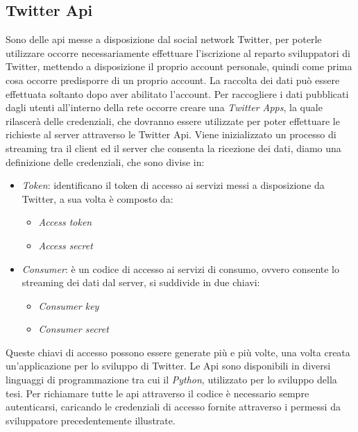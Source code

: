 \subsection{Twitter Api}
Sono delle api messe a disposizione dal social network Twitter, per poterle utilizzare occorre necessariamente effettuare l'iscrizione al reparto sviluppatori di Twitter, mettendo a disposizione il proprio account personale, quindi come prima cosa occorre predisporre di un proprio account. La raccolta dei dati può essere effettuata soltanto dopo aver abilitato l'account. Per raccogliere i dati pubblicati dagli utenti all'interno della rete occorre creare una \textit{Twitter Apps}, la quale rilascerà delle credenziali, che dovranno essere utilizzate per poter effettuare le richieste  al server attraverso le Twitter Api. Viene inizializzato un processo di streaming tra il client ed il server che consenta la ricezione dei dati, diamo una definizione delle credenziali, che sono divise in:
\begin{itemize}
\item \textit{Token}: identificano il token di accesso ai servizi messi a disposizione da Twitter, a sua volta è composto da:
\begin{itemize}
\item \textit{Access token}
\item \textit{Access secret}
\end{itemize}
\item \textit{Consumer}: è un codice di accesso ai servizi di consumo, ovvero consente lo streaming dei dati dal server, si suddivide in due chiavi:
\begin{itemize}
\item \textit{Consumer key}
\item \textit{Consumer secret}
\end{itemize}
\end{itemize}
Queste chiavi di accesso possono essere generate più e più volte, una volta creata un'applicazione per lo sviluppo di Twitter.
Le Api sono disponibili in diversi linguaggi di programmazione tra cui il \textit{Python}, utilizzato per lo sviluppo della tesi.
Per richiamare tutte le api attraverso il codice è necessario sempre autenticarsi, caricando le credenziali di accesso  fornite attraverso i permessi da sviluppatore precedentemente illustrate.

